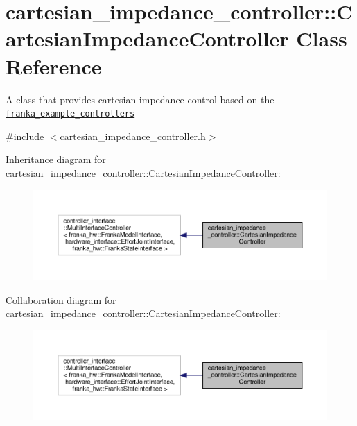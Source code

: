 \hypertarget{classcartesian__impedance__controller_1_1CartesianImpedanceController}{}\section{cartesian\+\_\+impedance\+\_\+controller\+:\+:Cartesian\+Impedance\+Controller Class Reference}
\label{classcartesian__impedance__controller_1_1CartesianImpedanceController}


A class that provides cartesian impedance control based on the \href{https://github.com/frankaemika/franka_ros/tree/kinetic-devel/franka_example_controllers}{\tt franka\+\_\+example\+\_\+controllers}  




{\ttfamily \#include $<$cartesian\+\_\+impedance\+\_\+controller.\+h$>$}



Inheritance diagram for cartesian\+\_\+impedance\+\_\+controller\+:\+:Cartesian\+Impedance\+Controller\+:
\nopagebreak
\begin{figure}[H]
\begin{center}
\leavevmode
\includegraphics[width=350pt]{d7/d61/classcartesian__impedance__controller_1_1CartesianImpedanceController__inherit__graph}
\end{center}
\end{figure}


Collaboration diagram for cartesian\+\_\+impedance\+\_\+controller\+:\+:Cartesian\+Impedance\+Controller\+:
\nopagebreak
\begin{figure}[H]
\begin{center}
\leavevmode
\includegraphics[width=350pt]{d5/d80/classcartesian__impedance__controller_1_1CartesianImpedanceController__coll__graph}
\end{center}
\end{figure}
